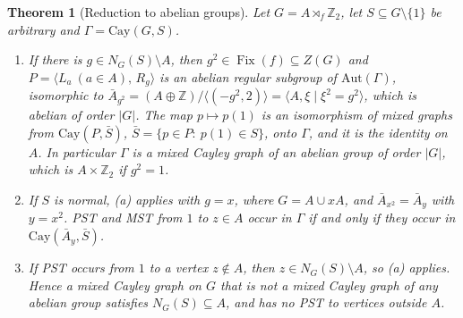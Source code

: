 \documentclass[preprint,11pt]{elsarticle}
\newtheorem{theorem}{Theorem}[section]
\theoremstyle{definition}
\theoremstyle{remark}
\DeclareMathOperator{\Fix}{Fix}
\newcommand{\Z}{\mathbb Z}
\begin{document}
\begin{theorem}[Reduction to abelian groups]\label{thm:B}
Let $G=A\rtimes_f\Z_2$, let $S\subseteq G\setminus\{1\}$ be arbitrary and $\Gamma=\mathrm{Cay}(G,S)$.
\begin{enumerate}
\item[(a)] If there is $g\in N_G(S)\setminus A$, then $g^2\in\Fix(f)\subseteq Z(G)$ and $P=\langle L_a\ (a\in A),\,R_g\rangle$ is an abelian regular subgroup of $\mathrm{Aut}(\Gamma)$, isomorphic to $\bar A_{g^2}=(A\oplus\Z)/\langle(-g^2,2)\rangle=\langle A,\xi\mid\xi^2=g^2\rangle$, which is abelian of order $|G|$. The map $p\mapsto p(1)$ is an isomorphism of mixed graphs from $\mathrm{Cay}(P,\bar S)$, $\bar S=\{p\in P:\ p(1)\in S\}$, onto $\Gamma$, and it is the identity on $A$. In particular $\Gamma$ is a mixed Cayley graph of an abelian group of order $|G|$, which is $A\times\Z_2$ if $g^2=1$.
\item[(b)] If $S$ is normal, (a) applies with $g=x$, where $G=A\cup xA$, and $\bar A_{x^2}=\bar A_y$ with $y=x^2$. PST and MST from $1$ to $z\in A$ occur in $\Gamma$ if and only if they occur in $\mathrm{Cay}(\bar A_y,\bar S)$.
\item[(c)] If PST occurs from $1$ to a vertex $z\notin A$, then $z\in N_G(S)\setminus A$, so (a) applies. Hence a mixed Cayley graph on $G$ that is not a mixed Cayley graph of any abelian group satisfies $N_G(S)\subseteq A$, and has no PST to vertices outside $A$.
\end{enumerate}
\end{theorem}
\end{document}
